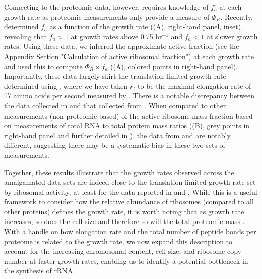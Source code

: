 Connecting  to the proteomic data, however, requires knowledge of $f_a$ at each growth rate as proteomic
measurements only provide a measure of $\Phi_R$. Recently, \cite{dai2016}
determined $f_a$ as a function of the growth rate ((A),
right-hand panel, inset), revealing that $f_a \approx 1$ at growth rates above
0.75 hr$^{-1}$ and $f_a < 1$ at slower growth rates. Using these data, we
inferred the approximate active fraction (see the Appendix Section "Calculation
of active ribosomal fraction") at each growth rate and used this to compute
$\Phi_R \times f_a$ ((A), colored points in right-hand
panel). Importantly, these data largely skirt the translation-limited growth rate
determined using , where we have taken $r_t$ to be the maximal
elongation rate of 17 amino acids per second measured by \cite{dai2016}. There
is a notable discrepancy between the data collected in \cite{schmidt2016,
li2014} and that collected from \cite{valgepea2013, peebo2015}. When compared to
other measurements (non-proteomic based) of the active ribosome mass fraction
based on measurements of total RNA to total protein mass ratios
((B), grey points in right-hand panel and  further detailed
in ), the data from
\cite{valgepea2013} and \cite{peebo2015} are notably different, suggesting there
may be a systematic bias in these two sets of measurements.

Together, these results illustrate that the growth rates observed across the
amalgamated data sets are indeed close to the translation-limited growth rate
set by ribosomal activity, at least for the data reported in \cite{schmidt2016}
and \cite{li2014}. While this is a useful framework to consider how the relative
abundance of ribosomes (compared to all other proteins) defines the growth rate,
it is worth noting that as growth rate increases, so does the cell size and
therefore so will the total proteomic mass \citep{basan2015}. With a handle on
how elongation rate and the total number of peptide bonds per proteome is
related to the growth rate, we now expand this description to account for the
increasing chromosomal content, cell size, and  ribosome copy number at faster
growth rates, enabling us to identify a potential bottleneck in the synthesis of
rRNA.

